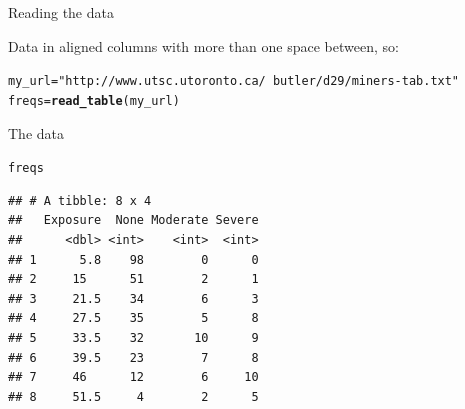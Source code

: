 \documentclass[unknownkeysallowed]{beamer}\usepackage[]{graphicx}\usepackage[]{color}
\makeatletter
\newcommand{\hlstr}[1]{\textcolor[rgb]{0.192,0.494,0.8}{#1}}%
\newcommand{\hlstd}[1]{\textcolor[rgb]{0.345,0.345,0.345}{#1}}%
\newcommand{\hlkwb}[1]{\textcolor[rgb]{0.69,0.353,0.396}{#1}}%
\newcommand{\hlkwd}[1]{\textcolor[rgb]{0.737,0.353,0.396}{\textbf{#1}}}%
\newenvironment{kframe}{%
 \def\at@end@of@kframe{}%
 \ifinner\ifhmode%
  \def\at@end@of@kframe{\end{minipage}}%
  \begin{minipage}{\columnwidth}%
 \fi\fi%
 \def\FrameCommand##1{\hskip\@totalleftmargin \hskip-\fboxsep
 \colorbox{shadecolor}{##1}\hskip-\fboxsep
     \hskip-\linewidth \hskip-\@totalleftmargin \hskip\columnwidth}%
 \MakeFramed {\advance\hsize-\width
   \@totalleftmargin\z@ \linewidth\hsize
   \@setminipage}}%
 {\par\unskip\endMakeFramed%
 \at@end@of@kframe}
\newenvironment{knitrout}{}{} %
\makeatother
\begin{document}
\begin{frame}[fragile]{Reading the data}

Data in aligned columns with more than one space between, so: 
  
\begin{knitrout}
\color{fgcolor}\begin{kframe}
\begin{alltt}
\hlstd{my_url}\hlkwb{=}\hlstr{"http://www.utsc.utoronto.ca/~butler/d29/miners-tab.txt"}
\hlstd{freqs}\hlkwb{=}\hlkwd{read_table}\hlstd{(my_url)}
\end{alltt}


{\ttfamily\noindent\itshape\color{messagecolor}{\#\# Parsed with column specification:\\\#\# cols(\\\#\#\ \  Exposure = col\_double(),\\\#\#\ \  None = col\_integer(),\\\#\#\ \  Moderate = col\_integer(),\\\#\#\ \  Severe = col\_integer()\\\#\# )}}\end{kframe}
\end{knitrout}

  
\end{frame}

\begin{frame}[fragile]{The data}
  
\begin{knitrout}
\color{fgcolor}\begin{kframe}
\begin{alltt}
\hlstd{freqs}
\end{alltt}
\begin{verbatim}
## # A tibble: 8 x 4
##   Exposure  None Moderate Severe
##      <dbl> <int>    <int>  <int>
## 1      5.8    98        0      0
## 2     15      51        2      1
## 3     21.5    34        6      3
## 4     27.5    35        5      8
## 5     33.5    32       10      9
## 6     39.5    23        7      8
## 7     46      12        6     10
## 8     51.5     4        2      5
\end{verbatim}
\end{kframe}
\end{knitrout}
  
\end{frame}
\end{document}
